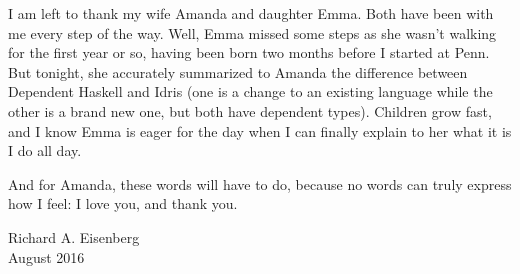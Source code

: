 I am left to thank my wife Amanda and daughter Emma. Both have been
with me every step of the way. Well, Emma missed some steps as she wasn't
walking for the first year or so, having been born two months before
I started at Penn. But tonight, she accurately summarized to Amanda
the difference between Dependent Haskell and Idris (one is a change
to an existing language while the other is a brand new one, but both
have dependent types). Children grow fast, and I know Emma is eager for
the day when I can finally explain to her what it is I do all day.

And for Amanda, these words will have to do, because no words can
truly express how I feel: I love you, and thank you.

\begin{flushright}
Richard A. Eisenberg\\
August 2016
\end{flushright}

